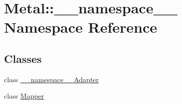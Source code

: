 \hypertarget{namespaceMetal_1_1____namespace____}{}\section{Metal\+:\+:\+\_\+\+\_\+namespace\+\_\+\+\_\+ Namespace Reference}
\label{namespaceMetal_1_1____namespace____}
\subsection*{Classes}
\begin{DoxyCompactItemize}
\item 
class \hyperlink{classMetal_1_1____namespace_____1_1____namespace____Adapter}{\+\_\+\+\_\+namespace\+\_\+\+\_\+\+Adapter}
\item 
class \hyperlink{classMetal_1_1____namespace_____1_1Mapper}{Mapper}
\end{DoxyCompactItemize}

